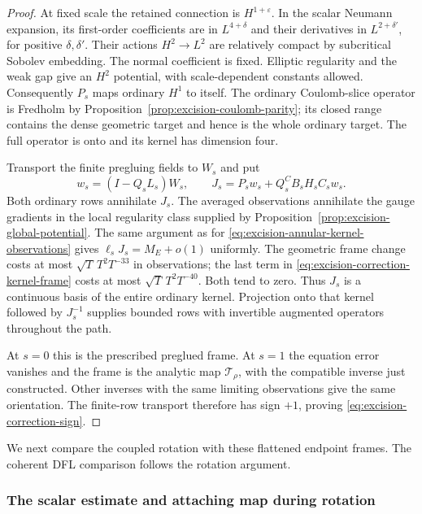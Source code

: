 \documentclass[11pt]{amsart}
\theoremstyle{definition}
\theoremstyle{remark}
\theoremstyle{plain}
\begin{document}
\begin{proof}
At fixed scale the retained connection is $H^{1+\varepsilon}$.
In the scalar Neumann expansion, its first-order coefficients
are in $L^{4+\delta}$ and their derivatives in
$L^{2+\delta'}$, for positive $\delta,\delta'$.
Their actions $H^2\to L^2$ are relatively compact by
subcritical Sobolev embedding. The normal coefficient is
fixed. Elliptic regularity and the weak gap give an $H^2$
potential, with scale-dependent constants allowed.
Consequently $P_s$ maps ordinary $H^1$ to itself.
The ordinary Coulomb-slice operator is Fredholm by
Proposition~\ref{prop:excision-coulomb-parity}; its closed
range contains the dense geometric target and hence is
the whole ordinary target. The full operator is onto
and its kernel has dimension four.

Transport the finite pregluing fields to $W_s$ and put
\begin{equation}\label{eq:excision-correction-kernel-frame}
 w_s=(I-Q_sL_s)W_s,\qquad
 J_s=P_sw_s+Q_s^CB_sH_sC_sw_s .
\end{equation}
Both ordinary rows annihilate $J_s$.
The averaged observations annihilate the gauge gradients
in the local regularity class supplied by
Proposition~\ref{prop:excision-global-potential}.
The same argument as for
\eqref{eq:excision-annular-kernel-observations} gives
$\ell_sJ_s=M_E+o(1)$ uniformly.
The geometric frame change costs at most
$\sqrt T\,T^2T^{-33}$ in observations; the last term
in \eqref{eq:excision-correction-kernel-frame} costs at
most $\sqrt T\,T^2T^{-40}$. Both tend to zero.
Thus $J_s$ is a continuous basis of the entire ordinary
kernel. Projection onto that kernel followed by $J_s^{-1}$
supplies bounded rows with invertible augmented operators
throughout the path.

At $s=0$ this is the prescribed preglued frame.
At $s=1$ the equation error vanishes and the frame is
the analytic map $\mathcal T_\rho$, with the compatible
inverse just constructed. Other inverses with the same
limiting observations give the same orientation.
The finite-row transport therefore has sign $+1$,
proving \eqref{eq:excision-correction-sign}.
\end{proof}

We next compare the coupled rotation with these flattened endpoint
frames. The coherent DFL comparison follows the rotation argument.

\subsubsection{The scalar estimate and attaching map during rotation}
\end{document}
